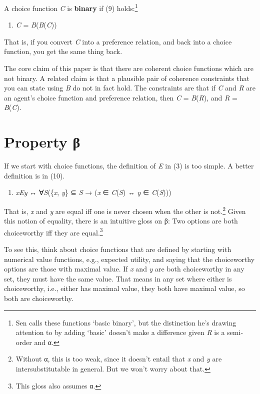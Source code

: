 \documentclass[
  11pt,
  letterpaper,
  DIV=11,
  numbers=noendperiod,
  twoside]{scrartcl}
\providecommand{\tightlist}{%
  \setlength{\itemsep}{0pt}\setlength{\parskip}{0pt}}
\begin{document}
A choice function \emph{C} is \textbf{binary} if (9) holds:\footnote{Sen
  calls these functions `basic binary', but the distinction he's drawing
  attention to by adding `basic' doesn't make a difference given
  \emph{R} is a semi-order and α.}

\begin{enumerate}
\def\labelenumi{(\arabic{enumi})}
\setcounter{enumi}{8}
\tightlist
\item
  \emph{C} = \emph{B}(\emph{B}(\emph{C}))
\end{enumerate}

That is, if you convert \emph{C} into a preference relation, and back
into a choice function, you get the same thing back.

The core claim of this paper is that there are coherent choice functions
which are not binary. A related claim is that a plausible pair of
coherence constraints that you can state using \emph{B} do not in fact
hold. The constraints are that if \emph{C} and \emph{R} are an agent's
choice function and preference relation, then \emph{C} =
\emph{B}(\emph{R}), and \emph{R} = \emph{B}(\emph{C}).

\section{Property β}\label{property-ux3b2}

If we start with choice functions, the definition of \emph{E} in (3) is
too simple. A better definition is in (10).

\begin{enumerate}
\def\labelenumi{(\arabic{enumi})}
\setcounter{enumi}{9}
\tightlist
\item
  \emph{xEy} ↔ ∀\emph{S}(\{\emph{x}, \emph{y}\} ⊆ \emph{S} → (\emph{x} ∈
  \emph{C}(\emph{S}) ↔ \emph{y} ∈ \emph{C}(\emph{S})))
\end{enumerate}

That is, \emph{x} and \emph{y} are equal iff one is never chosen when
the other is not.\footnote{Without α, this is too weak, since it doesn't
  entail that \emph{x} and \emph{y} are intersubstitutable in general.
  But we won't worry about that.} Given this notion of equality, there
is an intuitive gloss on β: Two options are both choiceworthy iff they
are equal.\footnote{This gloss also assumes α.}

To see this, think about choice functions that are defined by starting
with numerical value functions, e.g., expected utility, and saying that
the choiceworthy options are those with maximal value. If \emph{x} and
\emph{y} are both choiceworthy in any set, they must have the same
value. That means in any set where either is choiceworthy, i.e., either
has maximal value, they both have maximal value, so both are
choiceworthy.
\end{document}
